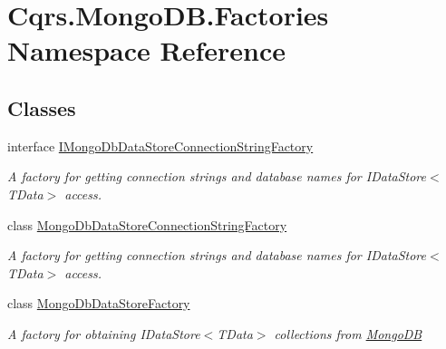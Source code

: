 \hypertarget{namespaceCqrs_1_1MongoDB_1_1Factories}{}\section{Cqrs.\+Mongo\+D\+B.\+Factories Namespace Reference}
\label{namespaceCqrs_1_1MongoDB_1_1Factories}
\subsection*{Classes}
\begin{DoxyCompactItemize}
\item 
interface \hyperlink{interfaceCqrs_1_1MongoDB_1_1Factories_1_1IMongoDbDataStoreConnectionStringFactory}{I\+Mongo\+Db\+Data\+Store\+Connection\+String\+Factory}
\begin{DoxyCompactList}\small\item\em A factory for getting connection strings and database names for I\+Data\+Store$<$\+T\+Data$>$ access. \end{DoxyCompactList}\item 
class \hyperlink{classCqrs_1_1MongoDB_1_1Factories_1_1MongoDbDataStoreConnectionStringFactory}{Mongo\+Db\+Data\+Store\+Connection\+String\+Factory}
\begin{DoxyCompactList}\small\item\em A factory for getting connection strings and database names for I\+Data\+Store$<$\+T\+Data$>$ access. \end{DoxyCompactList}\item 
class \hyperlink{classCqrs_1_1MongoDB_1_1Factories_1_1MongoDbDataStoreFactory}{Mongo\+Db\+Data\+Store\+Factory}
\begin{DoxyCompactList}\small\item\em A factory for obtaining I\+Data\+Store$<$\+T\+Data$>$ collections from \hyperlink{namespaceCqrs_1_1MongoDB}{Mongo\+DB} \end{DoxyCompactList}\end{DoxyCompactItemize}
